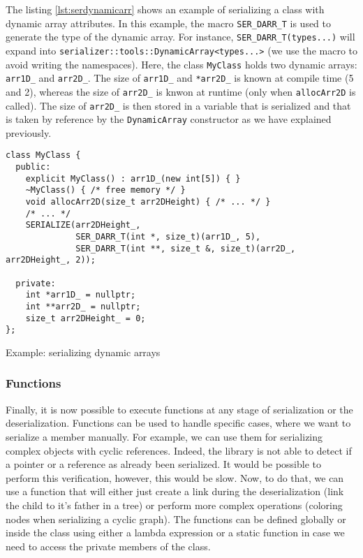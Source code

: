 The listing \ref{lst:serdynamicarr} shows an example of serializing a class with
dynamic array attributes. In this example, the macro \texttt{SER\_DARR\_T} is
used to generate the type of the dynamic array. For instance,
\texttt{SER\_DARR\_T(types...)} will expand into
\texttt{serializer::tools::DynamicArray<types...>} (we use the macro to avoid
writing the namespaces). Here, the class \texttt{MyClass} holds two dynamic
arrays: \texttt{arr1D\_} and \texttt{arr2D\_}. The size of \texttt{arr1D\_} and
\texttt{*arr2D\_} is known at compile time (5 and 2), whereas the size of
\texttt{arr2D\_} is knwon at runtime (only when \texttt{allocArr2D} is called).
The size of \texttt{arr2D\_} is then stored in a variable that is serialized and
that is taken by reference by the \texttt{DynamicArray} constructor as we have
explained previously.

\begin{listing}[ht!]
\begin{verbatim}
class MyClass {
  public:
    explicit MyClass() : arr1D_(new int[5]) { }
    ~MyClass() { /* free memory */ }
    void allocArr2D(size_t arr2DHeight) { /* ... */ }
    /* ... */
    SERIALIZE(arr2DHeight_,
              SER_DARR_T(int *, size_t)(arr1D_, 5),
              SER_DARR_T(int **, size_t &, size_t)(arr2D_, arr2DHeight_, 2));

  private:
    int *arr1D_ = nullptr;
    int **arr2D_ = nullptr;
    size_t arr2DHeight_ = 0;
};
\end{verbatim}
\caption{Example: serializing dynamic arrays}
\label{lst:serdynamicarr}
\end{listing}

\subsubsection{Functions}

Finally, it is now possible to execute functions at any stage of serialization
or the deserialization. Functions can be used to handle specific cases, where we
want to serialize a member manually. For example, we can use them for
serializing complex objects with cyclic references. Indeed, the library is not
able to detect if a pointer or a reference as already been serialized. It would
be possible to perform this verification, however, this would be slow. Now, to
do that, we can use a function that will either just create a link during the
deserialization (link the child to it's father in a tree) or perform more
complex operations (coloring nodes when serializing a cyclic graph). The
functions can be defined globally or inside the class using either a lambda
expression or a static function in case we need to access the private members of
the class.

